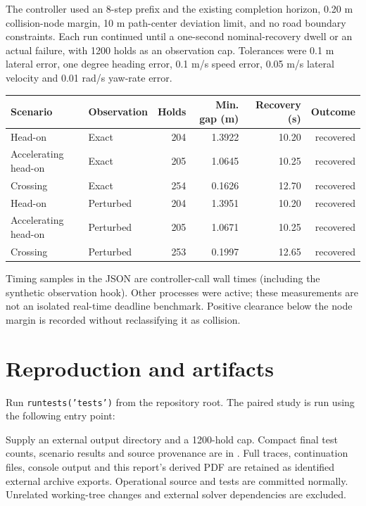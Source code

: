 \documentclass[11pt]{article}
\begin{document}
The controller used an 8-step prefix and the existing completion horizon,
0.20 m collision-node margin, 10 m path-center deviation limit, and no road
boundary constraints. Each run continued until a one-second nominal-recovery
dwell or an actual failure, with 1200 holds as an observation cap. Tolerances
were 0.1 m lateral error, one degree heading error, 0.1 m/s speed error,
0.05 m/s lateral velocity and 0.01 rad/s yaw-rate error.

\begin{center}
\small
\begin{tabular}{llrrrr}
\toprule
Scenario & Observation & Holds & Min. gap (m) & Recovery (s) & Outcome\\
\midrule
Head-on & Exact & 204 & 1.3922 & 10.20 & recovered \\
Accelerating head-on & Exact & 205 & 1.0645 & 10.25 & recovered \\
Crossing & Exact & 254 & 0.1626 & 12.70 & recovered \\
Head-on & Perturbed & 204 & 1.3951 & 10.20 & recovered \\
Accelerating head-on & Perturbed & 205 & 1.0671 & 10.25 & recovered \\
Crossing & Perturbed & 253 & 0.1997 & 12.65 & recovered \\
\bottomrule
\end{tabular}
\end{center}

Timing samples in the JSON are controller-call wall times (including the
synthetic observation hook). Other processes were active; these measurements
are not an isolated real-time deadline benchmark. Positive clearance below
the node margin is recorded without reclassifying it as collision.

\section{Reproduction and artifacts}
Run \texttt{runtests('tests')} from the repository root. The paired study is
run using the following entry point:
\begin{quote}\small
{}
\end{quote}
Supply an external output directory and a 1200-hold cap. Compact final test counts, scenario
results and source provenance are in
.
Full traces, continuation files, console output and this report's derived PDF
are retained as identified external archive exports. Operational source and
tests are committed normally. Unrelated working-tree changes and external
solver dependencies are excluded.
\end{document}

